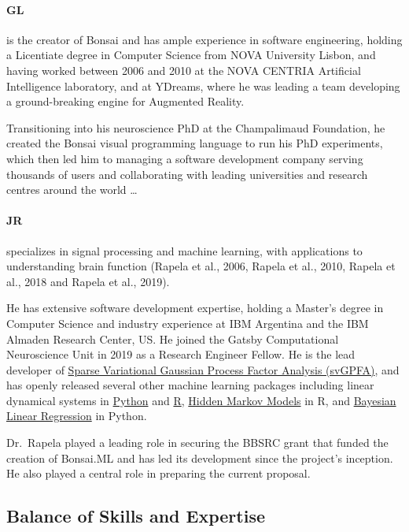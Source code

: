 \paragraph{GL} is the creator of Bonsai and has ample experience in software engineering, holding a Licentiate degree in Computer Science from NOVA University Lisbon, and having worked between 2006 and 2010 at the NOVA CENTRIA Artificial Intelligence laboratory, and at YDreams, where he was leading a team developing a ground-breaking engine for Augmented Reality.

Transitioning into his neuroscience PhD at the Champalimaud Foundation, he created the Bonsai visual programming language to run his PhD experiments, which then led him to managing a software development company serving thousands of users and collaborating with leading universities and research centres around the world \ldots

\paragraph{JR} specializes in
signal processing and machine learning, with applications to understanding
brain function (Rapela et al., 2006, Rapela et al., 2010, Rapela et al., 2018
and Rapela et al., 2019).

He has extensive software development expertise, holding a Master’s degree in
Computer Science and industry experience at IBM Argentina and the IBM Almaden
Research Center, US.
%
He joined the Gatsby Computational Neuroscience Unit in 2019 as a Research
Engineer Fellow.
%
He is the lead developer of \href{https://github.com/joacorapela/svGPFA}{Sparse
Variational Gaussian Process Factor Analysis (svGPFA)}, and has openly released
several other machine learning packages including linear dynamical systems in
\href{https://github.com/joacorapela/ssm}{Python} and
\href{https://github.com/joacorapela/kalmanFilter}{R},
\href{https://github.com/joacorapela/hiddenMarkovModels}{Hidden Markov Models}
in R, and
\href{https://github.com/joacorapela/bayesianLinearRegression}{Bayesian Linear
Regression} in Python.

Dr.~Rapela played a leading role in securing the BBSRC grant that funded the
creation of Bonsai.ML and has led its development since the project’s
inception. He also played a central role in preparing the current proposal.

\subsection{Balance of Skills and Expertise}

